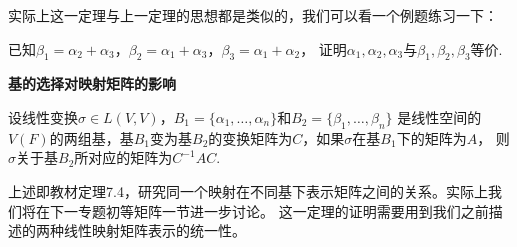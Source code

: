 实际上这一定理与上一定理的思想都是类似的，我们可以看一个例题练习一下：
\begin{example}
	已知$\beta_1=\alpha_2+\alpha_3$，$\beta_2=\alpha_1+\alpha_3$，$\beta_3=\alpha_1+\alpha_2$，
	证明$\alpha_1,\alpha_2,\alpha_3$与$\beta_1,\beta_2,\beta_3$等价.
\end{example}
\begin{theorem}
	\textbf{基的选择对映射矩阵的影响}
	
	设线性变换$\sigma \in L(V,V)$，$B_1=\{\alpha_1,\dots,\alpha_n\}$和$B_2=\{\beta_1,\dots,\beta_n\}$
	是线性空间的$V(F)$的两组基，基$B_1$变为基$B_2$的变换矩阵为$C$，如果$\sigma$在基$B_1$下的矩阵为$A$，
	则$\sigma$关于基$B_2$所对应的矩阵为$C^{-1}AC$.
\end{theorem}
上述即教材定理7.4，研究同一个映射在不同基下表示矩阵之间的关系。实际上我们将在下一专题初等矩阵一节进一步讨论。
这一定理的证明需要用到我们之前描述的两种线性映射矩阵表示的统一性。

